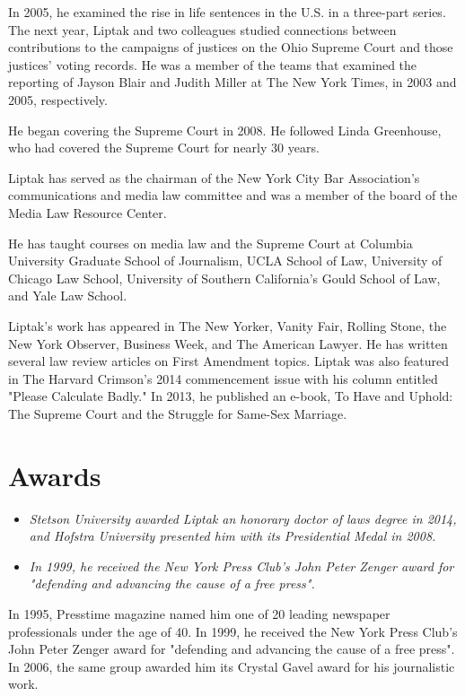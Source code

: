In 2005, he examined the rise in life sentences in the U.S. in a
three-part series. The next year, Liptak and two colleagues studied
connections between contributions to the campaigns of justices on the
Ohio Supreme Court and those justices' voting records. He was a member
of the teams that examined the reporting of Jayson Blair and Judith
Miller at The New York Times, in 2003 and 2005, respectively.

He began covering the Supreme Court in 2008. He followed Linda
Greenhouse, who had covered the Supreme Court for nearly 30 years.

Liptak has served as the chairman of the New York City Bar Association's
communications and media law committee and was a member of the board of
the Media Law Resource Center.

He has taught courses on media law and the Supreme Court at Columbia
University Graduate School of Journalism, UCLA School of Law, University
of Chicago Law School, University of Southern California's Gould School
of Law, and Yale Law School.

Liptak's work has appeared in The New Yorker, Vanity Fair, Rolling
Stone, the New York Observer, Business Week, and The American Lawyer. He
has written several law review articles on First Amendment topics.
Liptak was also featured in The Harvard Crimson's 2014 commencement
issue with his column entitled "Please Calculate Badly." In 2013, he
published an e-book, To Have and Uphold: The Supreme Court and the
Struggle for Same-Sex Marriage.

\section{Awards}\label{awards}

\begin{itemize}
\item
  \emph{Stetson University awarded Liptak an honorary doctor of laws
  degree in 2014, and Hofstra University presented him with its
  Presidential Medal in 2008.}
\item
  \emph{In 1999, he received the New York Press Club's John Peter Zenger
  award for "defending and advancing the cause of a free press".}
\end{itemize}

In 1995, Presstime magazine named him one of 20 leading newspaper
professionals under the age of 40. In 1999, he received the New York
Press Club's John Peter Zenger award for "defending and advancing the
cause of a free press". In 2006, the same group awarded him its Crystal
Gavel award for his journalistic work.

